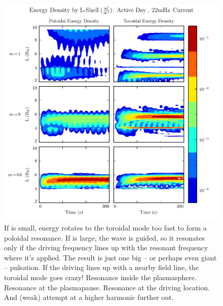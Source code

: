 
\begin{figure}[H]
    \centering
    \includegraphics[width=\textwidth]{figures/layers_22mHz_1.pdf}
    \caption[Poloidal and Toroidal Energy Distribution: Resonant Driving]{
      If \azm is small, energy rotates to the toroidal mode too fast to form a poloidal resonance. If \azm is large, the \Alfven wave is guided, so it resonates only if the driving frequency lines up with the resonant frequency where it's applied. The result is just one big -- or perhaps even giant -- pulsation. If the driving lines up with a nearby field line, the toroidal mode goes crazy! Resonance inside the plasmasphere. Resonance at the plasmapause. Resonance at the driving location. And (weak) attempt at a higher harmonic further out. 
    }
    \label{fig_resonant_driving}
\end{figure}







